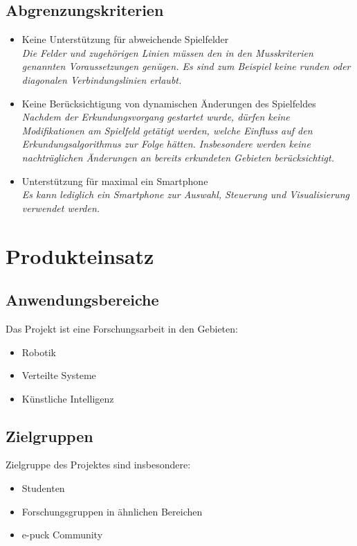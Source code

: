 \documentclass[10pt,a4paper]{article}
\begin{document}
		\subsection{Abgrenzungskriterien}
			\begin{itemize}
				\item Keine Unterstützung für abweichende Spielfelder
					\\ \textsl{Die Felder und zugehörigen Linien müssen den in den Musskriterien genannten Voraussetzungen
						genügen. Es sind zum Beispiel keine runden oder diagonalen Verbindungslinien erlaubt.}
				\item Keine Berücksichtigung von dynamischen Änderungen des Spielfeldes
					\\ \textsl{Nachdem der Erkundungsvorgang gestartet wurde, dürfen keine Modifikationen am
						Spielfeld getätigt werden, welche Einfluss auf den Erkundungsalgorithmus zur Folge hätten.
						Insbesondere werden keine nachträglichen Änderungen an bereits erkundeten Gebieten berücksichtigt.}			
				\item Unterstützung für maximal ein Smartphone
					\\ \textsl{Es kann lediglich ein Smartphone zur Auswahl, Steuerung und Visualisierung verwendet
						werden.}		
			\end{itemize}
	\section{Produkteinsatz}
		\subsection{Anwendungsbereiche}
			Das Projekt ist eine Forschungsarbeit in den Gebieten:
			\begin{itemize}
				\item Robotik
				\item Verteilte Systeme
				\item Künstliche Intelligenz
			\end{itemize}
		\subsection{Zielgruppen}
			Zielgruppe des Projektes sind insbesondere: 
			\begin{itemize}
				\item Studenten
				\item Forschungsgruppen in ähnlichen Bereichen
				\item e-puck Community
			\end{itemize}
\end{document}
